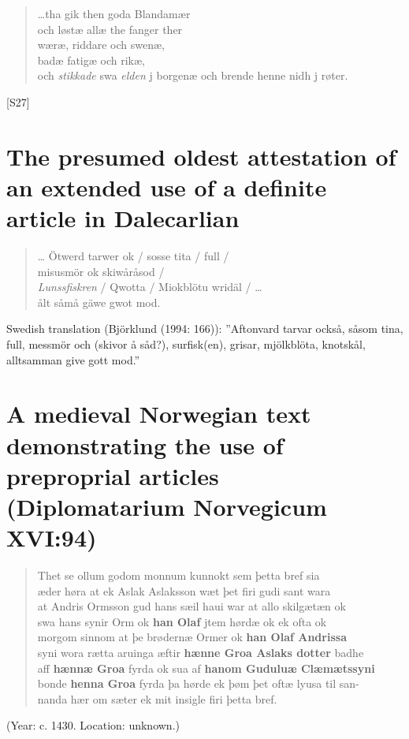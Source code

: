 \begin{quotation}


 
…tha gik then goda Blandamær\\
och løstæ allæ the fanger ther\\
wæræ, riddare och swenæ,\\
badæ fatigæ och rikæ,\\
och \textit{stikkade} swa \textit{elden} j borgenæ och brende henne nidh j røter.

\end{quotation}
[S27]

\section{The presumed oldest attestation of an extended use of a definite article in Dalecarlian}

\begin{quotation} 
… Ötwerd tarwer ok / sosse tita / full /\\
misusmör ok skiwåråsod / \\
\textit{Lunssfiskren} / Qwotta / Miokblötu wridäl / …\\
ålt såmå gäwe gwot mod.%
\\
\end{quotation}
 

Swedish translation (Björklund (1994: 166)): ”Aftonvard tarvar också, såsom tina, full, messmör och (skivor å såd?), surfisk(en), grisar, mjölkblöta, knotskål, alltsamman give gott mod.”

\section{A medieval Norwegian text demonstrating the use of preproprial articles (Diplomatarium Norvegicum XVI:94)}

\begin{quotation} 

Thet se ollum godom monnum kunnokt sem þetta bref sia\\
æder høra at ek Aslak Aslaksson wæt þet firi gudi sant wara\\
at Andris Ormsson gud hans sæil haui war at allo skilgætæn ok\\
swa hans synir Orm ok \textbf{han Olaf} jtem hørdæ ok ek ofta ok\\
morgom sinnom at þe brødernæ Ormer ok \textbf{han Olaf Andrissa}\\
syni wora rætta aruinga æftir \textbf{hænne Groa Aslaks dotter} badhe\\
aff \textbf{hænnæ Groa} fyrda ok sua af \textbf{hanom Guduluæ Clæmætssyni}\\
bonde \textbf{henna Groa} fyrda þa hørde ek þøm þet oftæ lyusa til san-\\
nanda hær om sæter ek mit insigle firi þetta bref.
\end{quotation}

 (Year: c. 1430. Location: unknown.)
